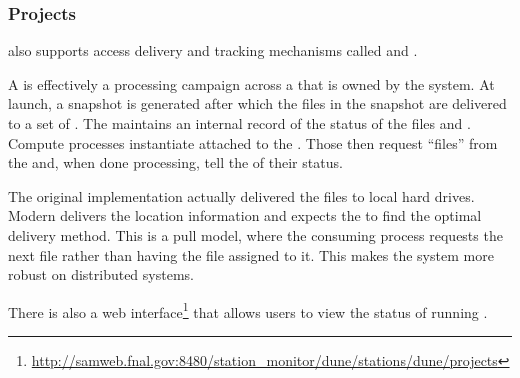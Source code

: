 \documentclass[../main-v1.tex]{subfiles}
\begin{document}




\subsubsection{Projects}


 also supports access delivery and  tracking mechanisms called  and .

A  is effectively a processing campaign across a  that is owned by the  system. At launch, a snapshot is generated after which the files in the snapshot are delivered to a set of .  The  maintains an internal record of the status of the files and . Compute processes instantiate  attached to the .  Those  then request ``files'' from the  and, when done processing, tell the  of their status.  

The original  implementation actually delivered the files to local hard drives.  Modern  delivers the location information and expects the  to find the optimal delivery method. This is a pull model, where the consuming process requests the next file rather than having the file assigned to it.  This makes the system more robust on distributed systems. 

There is also a web interface\footnote{\href{http://samweb.fnal.gov:8480/station_monitor/dune/stations/dune/projects}{http://samweb.fnal.gov:8480/station\_monitor/dune/stations/dune/projects}} that allows users to view the status of running . 






\end{document}
